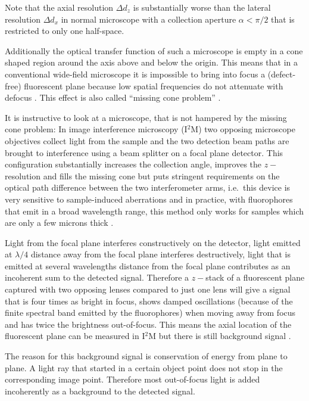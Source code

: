 Note that the axial resolution $\Delta d_z$ is substantially worse
than the lateral resolution $\Delta d_x$ in normal microscope with a
collection aperture $\alpha<\pi/2$ that is restricted to only one
half-space.

Additionally the optical transfer function of such a microscope is
empty in a cone shaped region around the axis above and below the
origin.  This means that in a conventional wide-field microscope it is
impossible to bring into focus a (defect-free) fluorescent plane
because low spatial frequencies do not attenuate with defocus
\citep{Neil1997}. This effect is also called ``missing cone problem''
\citep{Streibl1984}.

It is instructive to look at a microscope, that is not hampered by the
missing cone problem: In image interference microscopy (I${}^2$M) two
opposing microscope objectives collect light from the sample and the
two detection beam paths are brought to interference using a beam
splitter on a focal plane detector. This configuration substantially
increases the collection angle, improves the $z-$resolution and fills
the missing cone but puts stringent requirements on the optical path
difference between the two interferometer arms, i.e.\ this device is
very sensitive to sample-induced aberrations and in practice, with
fluorophores that emit in a broad wavelength range, this method only
works for samples which are only a few microns thick
\citep{Gustafsson1999}.



Light from the focal plane interferes constructively on the detector,
light emitted at $\lambda/4$ distance away from the focal plane
interferes destructively, light that is emitted at several wavelengths
distance from the focal plane contributes as an incoherent sum to the
detected signal. Therefore a $z-$stack of a fluorescent plane captured
with two opposing lenses compared to just one lens will give a signal
that is four times as bright in focus, shows damped oscillations
(because of the finite spectral band emitted by the fluorophores) when
moving away from focus and has twice the brightness out-of-focus. This
means the axial location of the fluorescent plane can be measured in
I${}^2$M but there is still background signal \citep{Gustafsson1995}.

The reason for this background signal is conservation of energy from
plane to plane. A light ray that started in a certain object point
does not stop in the corresponding image point. Therefore most
out-of-focus light is added incoherently as a background to the
detected signal.

